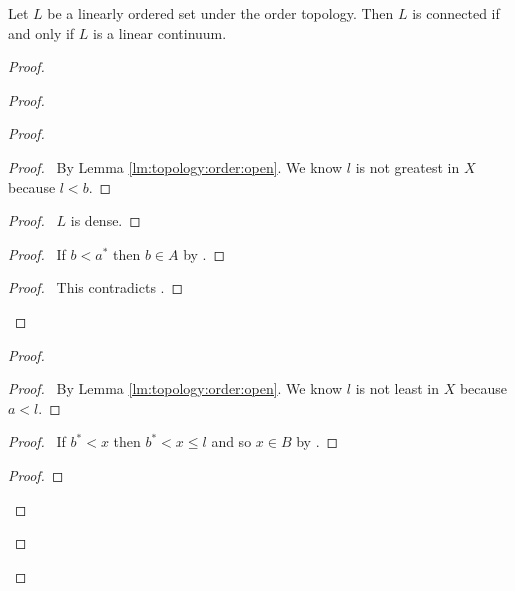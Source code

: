 \begin{thm}
  Let $L$ be a linearly ordered set under the order topology. Then $L$ is
connected if and only if $L$ is a linear continuum.
\end{thm}

\begin{proof}
  \pf
  \begin{proof}
  \begin{proof}
    \step{<3>1}{\pick\ $a' > l$ such that $[l, a') \subseteq A$}
    \begin{proof}
      \pf\ By Lemma \ref{lm:topology:order:open}. We know $l$ is not greatest
      in $X$ because $l < b$.
    \end{proof}
    \begin{proof}
      \pf\ $L$ is dense.
    \end{proof}
    \begin{proof}
      \pf\ If $b < a^*$ then $b \in A$ by .
    \end{proof}
    \qedstep
    \begin{proof}
      \pf\ This contradicts .
    \end{proof}
  \end{proof}
  \begin{proof}
    \step{<3>1}{\pick\ $b' < l$ such that $(b', l] \subseteq B$}
    \begin{proof}
      \pf\ By Lemma \ref{lm:topology:order:open}. We know $l$ is not least in
      $X$ because $a < l$.
    \end{proof}
    \begin{proof}
      \pf\ If $b^* < x$ then $b^* < x \leq l$ and so $x \in B$ by
      .
    \end{proof}
    \qedstep
    \begin{proof}

\end{proof}
\end{proof}
\end{proof}
\end{proof}
